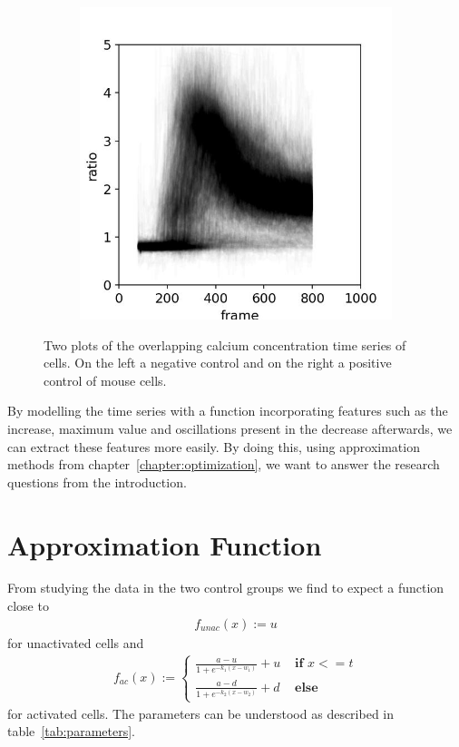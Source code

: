 \begin{figure}
\begin{subfigure}{0.45\linewidth}
		\includegraphics[width=\textwidth]{fig/all_cells_overlayed_mouse_pos}
	\end{subfigure}
	
	\caption{Two plots of the overlapping calcium concentration time series of cells. On the left a negative control and on the right a positive control of mouse cells.}
	\label{fig:all_cells_overlayed}
\end{figure}

By modelling the time series with a function incorporating features such as the increase, maximum value and oscillations present in the decrease afterwards, we can extract these features more easily. By doing this, using approximation methods from chapter~\ref{chapter:optimization}, we want to answer the research questions from the introduction.

\section{Approximation Function}

From studying the data in the two control groups we find to expect a function close to
\begin{align}
	\label{math:function_unactivated_cell}
	f_{unac}(x) := u
\end{align}
for unactivated cells and
\begin{align}
	\label{math:function_activated_cell}
	f_{ac}(x) := \begin{cases}
		\frac{a-u}{1 + e^{-k_1(x-w_1)}} + u & \textbf{ if } x <= t\\
		\frac{a-d}{1 + e^{-k_2(x-w_2)}} + d & \textbf{ else}
	\end{cases}
\end{align}
for activated cells. The parameters can be understood as described in table~\ref{tab:parameters}.

